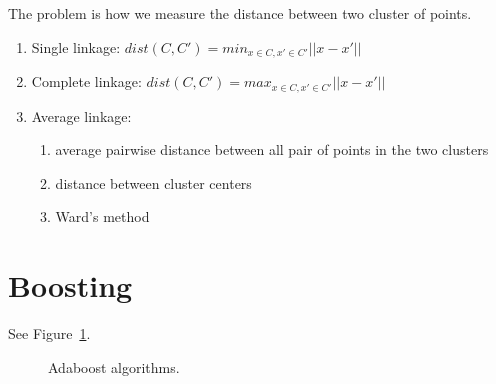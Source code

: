  The problem is how we measure the distance
between two cluster of points.
\begin{enumerate}
    \item Single linkage: $dist(C, C') = min_{x \in C, x' \in C'} ||x - x'||$
    \item Complete linkage: $dist(C, C') = max_{x \in C, x' \in C'} ||x - x'||$
    \item Average linkage:
        \begin{enumerate}
            \item average pairwise distance between all pair of points in the two clusters
            \item distance between cluster centers
            \item Ward's method
        \end{enumerate}
\end{enumerate}


\section{Boosting}
 See Figure~\ref{fig:adaboost_mar}.
\begin{figure}[H]
    \caption{Adaboost algorithms.}
    \label{fig:adaboost_mar}
\end{figure}

